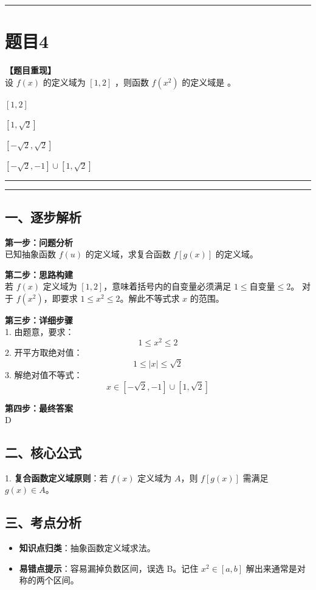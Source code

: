 \documentclass[12pt, a4paper]{ctexart}
\newcommand{\TopSeparator}{
    \par\noindent\rule{\textwidth}{1.5pt}\vspace{0.5em} %
}
\newcommand{\AnalysisSeparator}{
    \par\noindent\rule{\textwidth}{0.5pt}\vspace{0.2em}\hrule\vspace{0.5em} %
}
\newenvironment{RedAnalysis}{
    \par
    \color{red} %
}{
    \par
    \color{black} %
}
\newcommand{\choicesFour}[4]{
    \begin{enumerate}[label=\Alph*., itemsep=0pt, parsep=0pt, topsep=5pt, labelsep=0.5em]
        \begin{minipage}{0.22\linewidth} \item #1 \end{minipage}
        \begin{minipage}{0.22\linewidth} \item #2 \end{minipage}
        \begin{minipage}{0.22\linewidth} \item #3 \end{minipage}
        \begin{minipage}{0.22\linewidth} \item #4 \end{minipage}
    \end{enumerate}
}
\begin{document}
\vspace{2em}

\TopSeparator
\section*{题目4}

\textbf{【题目重现】} \\
设 $ f(x) $ 的定义域为 $ [1,2] $ ，则函数 $ f(x^{2}) $ 的定义域是 \underline{\hspace{1cm}}。
\choicesFour{$ [1,2] $}{$ [1,\sqrt{2}] $}{$ \left[-\sqrt{2},\sqrt{2}\right] $}{$ \left[-\sqrt{2},-1\right] \cup \left[1,\sqrt{2}\right] $}

\AnalysisSeparator

\begin{RedAnalysis}

\subsection*{一、逐步解析}

\textbf{第一步：问题分析} \\
已知抽象函数 $f(u)$ 的定义域，求复合函数 $f[g(x)]$ 的定义域。

\textbf{第二步：思路构建} \\
若 $f(x)$ 定义域为 $[1, 2]$，意味着括号内的自变量必须满足 $1 \le \text{自变量} \le 2$。
对于 $f(x^2)$，即要求 $1 \le x^2 \le 2$。解此不等式求 $x$ 的范围。

\textbf{第三步：详细步骤} \\
1. 由题意，要求：
   \[ 1 \le x^2 \le 2 \]
2. 开平方取绝对值：
   \[ 1 \le |x| \le \sqrt{2} \]
3. 解绝对值不等式：
   \[ x \in [-\sqrt{2}, -1] \cup [1, \sqrt{2}] \]

\textbf{第四步：最终答案} \\
D

\subsection*{二、核心公式}
1. \textbf{复合函数定义域原则}：若 $f(x)$ 定义域为 $A$，则 $f[g(x)]$ 需满足 $g(x) \in A$。

\subsection*{三、考点分析}
\begin{itemize}
    \item \textbf{知识点归类}：抽象函数定义域求法。
    \item \textbf{易错点提示}：容易漏掉负数区间，误选 B。记住 $x^2 \in [a, b]$ 解出来通常是对称的两个区间。
\end{itemize}

\end{RedAnalysis}
\end{document}
